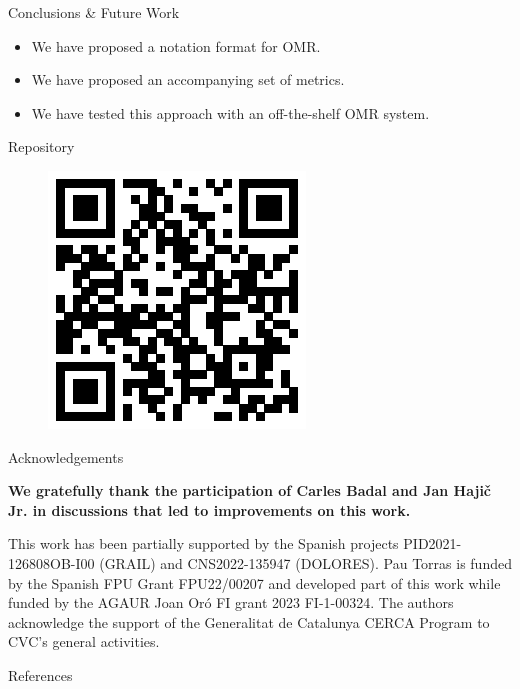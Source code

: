 \documentclass[UKenglish, aspectratio = 169]{beamer}
\begin{document}
\begin{frame}[c]{Conclusions \& Future Work}
	\begin{itemize}
		\item<1-> We have proposed a notation format for OMR.
		\item<1-> We have proposed an accompanying set of metrics.
		\item<1-> We have tested this approach with an off-the-shelf OMR system.

	\end{itemize}
	
\end{frame}

\begin{frame}{Repository}
	\begin{figure}
		\includegraphics[height=.9\textheight]{images/qr_code.eps}
	\end{figure}
\end{frame}

\begin{frame}[c]{Acknowledgements}

\textbf{We gratefully thank the participation of Carles Badal and Jan Hajič Jr. in discussions that led to improvements on this work.}

\vspace{1cm}

\begin{small}	
This work has been partially supported by the Spanish projects PID2021-126808OB-I00 (GRAIL) and CNS2022-135947 (DOLORES). Pau Torras is funded by the Spanish FPU Grant FPU22/00207 and developed part of this work while funded by the AGAUR Joan Oró FI grant 2023 FI-1-00324. The authors acknowledge the support of the Generalitat de Catalunya CERCA Program to CVC’s general activities.
\end{small}


\end{frame}

\begin{frame}[allowframebreaks]{References}
	
	
\end{frame}
\end{document}
